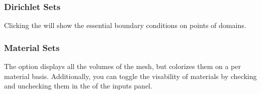 \subsubsection{Dirichlet Sets}
Clicking the  will show the essential boundary conditions on points of domains.

\subsubsection{Material Sets}
The  option displays all the volumes of the mesh, but colorizes them on a per material basis.  Additionally, you can toggle the visability of materials by checking and unchecking them in the  of the inputs panel.